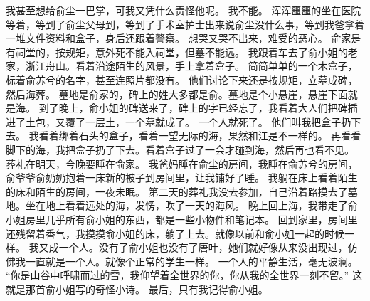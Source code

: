 我甚至想给俞尘一巴掌，可我又凭什么责怪他呢。
我不能。
浑浑噩噩的坐在医院等着，等到了俞尘父母到，等到了手术室护士出来说俞尘没什么事，等到我爸拿着一堆文件资料和盒子，身后还跟着警察。
想哭又哭不出来，难受的恶心。
俞家是有祠堂的，按规矩，意外死不能入祠堂，但墓不能远。
我跟着车去了俞小姐的老家，浙江舟山。看着沿途陌生的风景，手上拿着盒子。
简简单单的一个木盒子，标着俞苏兮的名字，甚至连照片都没有。
他们讨论下来还是按规矩，立墓成碑，然后海葬。
墓地是俞家的，碑上的姓大多都是俞。墓地是个小悬崖，悬崖下面就是海。
到了晚上，俞小姐的碑送来了，碑上的字已经忘了，我看着大人们把碑插进了土包，又覆了一层土，一个墓就成了。
一个人就死了。
他们叫我把盒子扔下去。
我看着绑着石头的盒子，看着一望无际的海，果然和江是不一样的。
再看看脚下的海，我把盒子扔了下去。看着盒子过了一会才碰到海，然后再也看不见。
葬礼在明天，今晚要睡在俞家。
我爸妈睡在俞尘的房间，我睡在俞苏兮的房间，俞爷爷俞奶奶抱着一床新的被子到房间里，让我铺好了睡。
我躺在床上看着陌生的床和陌生的房间，一夜未眠。
第二天的葬礼我没去参加，自己沿着路摸去了墓地。坐在地上看着远处的海，发愣，吹了一天的海风。
晚上回上海，我带走了俞小姐房里几乎所有俞小姐的东西，都是一些小物件和笔记本。
回到家里，房间里还残留着香气，我摸摸俞小姐的床，躺了上去。就像以前和俞小姐一起的时候一样。
我又成一个人。没有了俞小姐也没有了唐叶，她们就好像从来没出现过，仿佛我一直就是一个人。就像个正常的学生一样。
一个人的平静生活，毫无波澜。
“你是山谷中呼啸而过的雪，我仰望着全世界的你，你从我的全世界一刻不留。”
这就是那首俞小姐写的奇怪小诗。
最后，只有我记得俞小姐。


